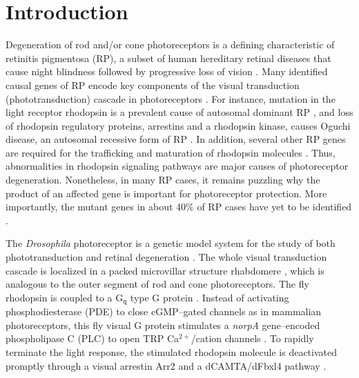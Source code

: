 \section{Introduction}
Degeneration of rod and/or cone photoreceptors is a defining characteristic of retinitis pigmentosa (RP), a subset of human hereditary retinal diseases \cite{Yamamoto1997} that cause night blindness followed by progressive loss of vision \cite{Hartong2006}.  Many identified causal genes of RP encode key components of the visual transduction (phototransduction) cascade in photoreceptors \cite{Hartong2006,Daiger2007}.  For instance, mutation in the light receptor rhodopsin is a prevalent cause of autosomal dominant RP \cite{Kaushal1994,Dryja2000,Wilson2003}, and loss of rhodopsin regulatory proteins, arrestins and a rhodopsin kinase, causes Oguchi disease, an autosomal recessive form of RP \cite{Fuchs1995,Yamamoto1997,Dryja2000}.  In addition, several other RP genes are required for the trafficking and maturation of rhodopsin molecules \cite{Hartong2006}.  Thus, abnormalities in rhodopsin signaling pathways are major causes of photoreceptor degeneration.  Nonetheless, in many RP cases, it remains puzzling why the product of an affected gene is important for photoreceptor protection.  More importantly, the mutant genes in about 40\% of RP cases have yet to be identified \cite{Hartong2006,Daiger2007}.

The \textit{Drosophila} photoreceptor is a genetic model system for the study of both phototransduction \cite{Montell1999,Hardie2001} and retinal degeneration \cite{Ranganathan2003}. The whole visual transduction cascade is localized in a packed microvillar structure rhabdomere \cite{Hardie2001}, which is analogous to the outer segment of rod and cone photoreceptors.  The fly rhodopsin is coupled to a G$_{\texttt{q}}$ type G protein \cite{Lee1994,Scott1995}.  Instead of activating phosphodiesterase (PDE) to close cGMP--gated channels as in mammalian photoreceptors, this fly visual G protein stimulates a \textit{norpA} gene--encoded phospholipase C (PLC) to open TRP Ca$^{2+}$/cation channels \cite{Bloomquist1988,Hardie1992,Montell1999}.  To rapidly terminate the light response, the stimulated rhodopsin molecule is deactivated promptly through a visual arrestin Arr2 \cite{Dolph1993} and a dCAMTA/dFbxl4 pathway \cite{Han2006}.
  

